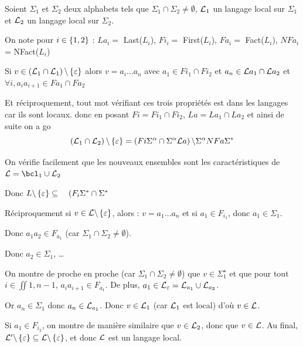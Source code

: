 \documentclass[a4paper,french,bookmarks]{book}
\begin{document}
    \begin{nproof}
        Soient $\Sigma_1$ et $\Sigma_2$ deux alphabets tels que $\Sigma_1 \cap \Sigma_2 \neq \emptyset$, $\mathcal{L}_1$ un langage local sur $\Sigma_1$ et $\mathcal{L}_2$ un langage local sur $\Sigma_2$.
        
        On note pour \(i\in \left\{1, 2\right\}\) : \(La_i =\) Last(\(L_i\)), \(Fi_i =\) First(\(L_i\)), \(Fa_i =\) Fact(\(L_i\)), \(NFa_i\) = NFact(\(L_i\))

        \begin{psse}
            \item Si \(v \in \left(\mathcal{L}_1\cap\mathcal{L}_1\right)\backslash\left\{\varepsilon\right\}\) alors \(v = a_i \hdots a_n\) avec \(a_1 \in Fi_1 \cap Fi_2\) et \(a_n \in \mathcal{L} a_1 \cap \mathcal{L} a_2\) et \(\forall i, a_i a_{i+1} \in Fa_1 \cap Fa_2\)

            Et réciproquement, tout mot vérifiant ces trois propriétés est dans les langages car ils sont locaux. donc en posant \(Fi = Fi_1 \cap Fi_2\), \(La = La_1 \cap La_2\) et ainsi de suite on a go 
            \[ \left(\mathcal{L}_1\cap \mathcal{L}_2 \right) \backslash \left\{\varepsilon\right\} = \left(Fi\Sigma^{\alpha} \cap \Sigma^{\alpha} \mathcal{L} a\right) \backslash \Sigma^{\alpha} NFa \Sigma^*\]

            On vérifie facilement que les nouveaux ensembles sont les caractéristiques de \(\bcL=\bcl_1\cup\bcL_2\)
            
            Donc $L \backslash \left\{\varepsilon\right\} \subseteq \quad (F_i \Sigma^* \cap \Sigma^* $

            \item Réciproquement  si \(v\in \mathcal{L}\backslash\left\{\varepsilon\right\}\), alors :
            $v = a_1\dots a_n$ et si $a_1 \in F_{i_1}$, donc $a_1 \in \Sigma_1$.
            
            Donc $a_1a_2 \in F_{a_1}$ (car $\Sigma_1 \cap \Sigma_2 \neq \emptyset$).
            
            Donc $a_2 \in \Sigma_1$, \dots
            
            On montre de proche en proche (car $\Sigma_1 \cap \Sigma_2 \neq \emptyset$) que $v \in \Sigma_1^\star$ et que pour tout $i \in \iint{1, n-1}$, $a_ia_{i+1} \in F_{a_1}$. De plus, $a_1 \in \mathcal{L}_\varepsilon  = \mathcal{L}_{a_1} \cup \mathcal{L}_{a_2}$.
            
            Or $a_n \in \Sigma_1$ donc $a_n \in \mathcal{L}_{a_1}$. Donc $v \in \mathcal{L}_1$ (car $\mathcal{L}_1$ est local) d'où $v \in \mathcal{L}$.
            
            Si $a_1 \in F_{i_2}$, on montre de manière similaire que $v \in \mathcal{L}_2$, donc que $v \in \mathcal{L}$. Au final, $\mathcal{L}' \backslash \left\{\varepsilon\right\} \subseteq \mathcal{L} \backslash \left\{\varepsilon\right\}$, et donc $\mathcal{L}$ est un langage local.
            

\end{psse}
\end{nproof}
\end{document}
